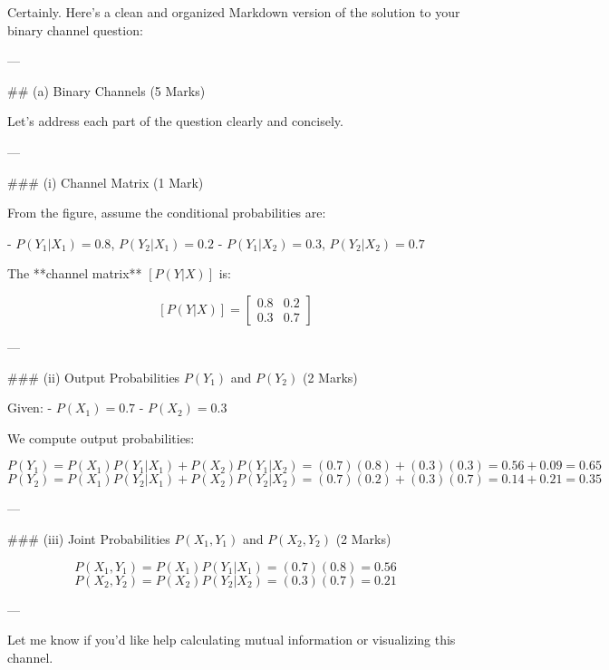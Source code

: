 Certainly. Here's a clean and organized Markdown version of the solution to your binary channel question:

---

## (a) Binary Channels (5 Marks)

Let’s address each part of the question clearly and concisely.

---

### (i) Channel Matrix (1 Mark)

From the figure, assume the conditional probabilities are:

- \( P(Y_1 | X_1) = 0.8 \), \( P(Y_2 | X_1) = 0.2 \)  
- \( P(Y_1 | X_2) = 0.3 \), \( P(Y_2 | X_2) = 0.7 \)

The **channel matrix** \( [P(Y|X)] \) is:

\[
[P(Y|X)] = 
\begin{bmatrix}
0.8 & 0.2 \\
0.3 & 0.7
\end{bmatrix}
\]

---

### (ii) Output Probabilities \( P(Y_1) \) and \( P(Y_2) \) (2 Marks)

Given:
- \( P(X_1) = 0.7 \)
- \( P(X_2) = 0.3 \)

We compute output probabilities:

\[
P(Y_1) = P(X_1)P(Y_1 | X_1) + P(X_2)P(Y_1 | X_2) = (0.7)(0.8) + (0.3)(0.3) = 0.56 + 0.09 = 0.65
\]
\[
P(Y_2) = P(X_1)P(Y_2 | X_1) + P(X_2)P(Y_2 | X_2) = (0.7)(0.2) + (0.3)(0.7) = 0.14 + 0.21 = 0.35
\]

---

### (iii) Joint Probabilities \( P(X_1, Y_1) \) and \( P(X_2, Y_2) \) (2 Marks)

\[
P(X_1, Y_1) = P(X_1)P(Y_1 | X_1) = (0.7)(0.8) = 0.56
\]
\[
P(X_2, Y_2) = P(X_2)P(Y_2 | X_2) = (0.3)(0.7) = 0.21
\]

---

Let me know if you'd like help calculating mutual information or visualizing this channel.
